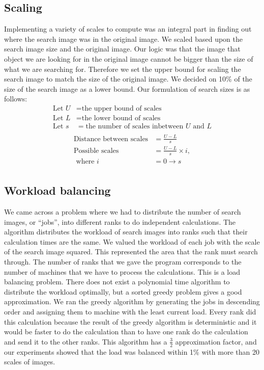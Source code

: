 \documentclass[10pt, journal]{vgtc}                %
\begin{document}
\subsection{Scaling}
Implementing a variety of scales to compute was an integral part in finding out where the search image was in the original image. We scaled based upon the search image size and the original image. Our logic was that the image that object we are looking for in the original image cannot be bigger than the size of what we are searching for. Therefore we set the upper bound for scaling the search image to match the size of the original image. We decided on 10\% of the size of the search image as a lower bound. Our formulation of search sizes is as follows:
\begin{align*}
	\text{Let }U &= \text{the upper bound of scales}\\
	\text{Let }L &= \text{the lower bound of scales}\\
	\text{Let }s &= \text{the number of scales inbetween } U \text{ and } L\\
\end{align*}
\begin{align*}
	\text{Distance} \text{ between scales} &= \frac{U-L}{s}\\
	\text{Poss}\text{ible scales} &=  \frac{U-L}{s} \times i,\\
	\text{ where } i &= 0\rightarrow s\\
\end{align*}
\subsection{Workload balancing}
We came across a problem where we had to distribute the number of search images, or “jobs”, into different ranks to do independent calculations. The algorithm distributes the workload of search images into ranks such that their calculation times are the same. We valued the workload of each job with the scale of the search image squared. This represented the area that the rank must search through. The number of ranks that we gave the program corresponds to the number of machines that we have to process the calculations. This is a load balancing problem. There does not exist a polynomial time algorithm to distribute the workload optimally, but a sorted greedy problem gives a good approximation. We ran the greedy algorithm by generating the jobs in descending order and assigning them to machine with the least current load. Every rank did this calculation because the result of the greedy algorithm is deterministic and it would be faster to do the calculation than to have one rank do the calculation and send it to the other ranks. This algorithm has a $\frac{3}{2}$ approximation factor, and our experiments showed that the load was balanced within 1\% with more than 20 scales of images.  
\end{document}
